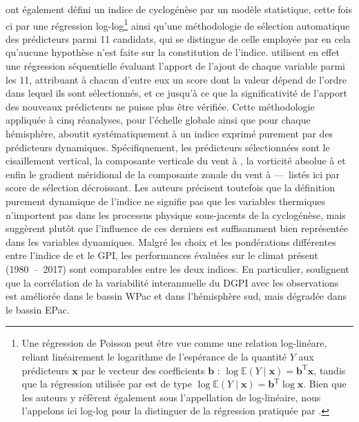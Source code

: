 \documentclass[../main.tex]{subfiles}
\begin{document}
\textcite{wang_dynamic_2020} ont également défini un indice de cyclogénèse par un modèle statistique, cette fois ci par une régression log-log\footnote{Une
régression de Poisson peut être vue comme une relation log-linéare, reliant linéairement le logarithme de l'espérance de la quantité $Y$ aux prédicteurs
$\mathbf{x}$ par le vecteur des coefficients $\mathbf{b}$ : $\log \mathbb{E} (Y \mid \mathbf{x}) = \mathbf{b}^{\mathrm{T}} \mathbf{x}$, tandis que la
régression utilisée par \textcite{wang_dynamic_2020} est de type $\log \mathbb{E}(Y \mid \mathbf{x}) = \mathbf{b}^{\mathrm{T}} \log \mathbf{x}$. Bien que
les auteurs y réfèrent également sous l'appellation de log-linéaire, nous l'appelons ici log-log pour la distinguer de la régression pratiquée par
\citeauthor{tippett_poisson_2011}.} ainsi qu'une méthodologie de sélection automatique des prédicteurs parmi \num{11} candidats, qui se distingue de celle
employée par \textcite{tippett_poisson_2011} en cela qu'aucune hypothèse n'est faite sur la constitution de l'indice. \textcite{wang_dynamic_2020} utilisent
en effet une régression séquentielle évaluant l'apport de l'ajout de chaque variable parmi les \num{11}, attribuant à chacun d'entre eux un score dont la valeur
dépend de l'ordre dans lequel ils sont sélectionnés, et ce jusqu'à ce que la significativité de l'apport des nouveaux prédicteurs ne puisse plus être vérifiée.
Cette méthodologie appliquée à cinq réanalyses, pour l'échelle globale ainsi que pour chaque hémisphère, aboutit systématiquement à un indice exprimé purement
par des prédicteurs dynamiques. Spécifiquement, les prédicteurs sélectionnées sont le cisaillement vertical, la composante verticale du vent à , la
vorticité absolue à  et enfin le gradient méridional de la composante zonale du vent à  ---~listés ici par score de sélection décroissant.
Les auteurs précisent toutefois que la définition purement dynamique de l'indice ne signifie pas que les variables thermiques
n'importent pas dans les processus physique sous-jacents de la cyclogénèse, mais suggèrent plutôt que l'influence de ces derniers est suffisamment bien
représentée dans les variables dynamiques. Malgré les choix et les pondérations différentes entre l'indice de \textcite{wang_dynamic_2020} et le GPI, les
performances évaluées sur le climat présent (\num{1980}~--~\num{2017}) sont comparables entre les deux indices. En particulier, \textcite{wang_dynamic_2020}
soulignent que la corrélation de la variabilité interannuelle du DGPI avec les observations est améliorée dans le bassin WPac et dans l'hémisphère sud, mais
dégradée dans le bassin EPac.
\end{document}
